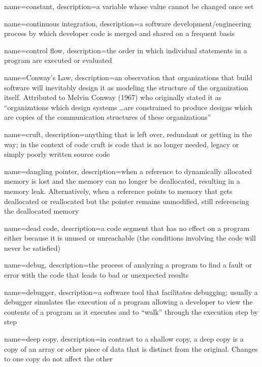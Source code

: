 {
  name=constant,
  description={a variable whose value cannot be changed once set}
}

{
  name=continuous integration,
  description={a software development/engineering process by which developer code is merged and shared on a frequent basis}
}

{
  name=control flow,
  description={the order in which individual statements in a program are executed or evaluated}
}

{
  name=Conway's Law,
  description={an observation that organizations that build software will inevitably design it as modeling the structure of the organization itself.  Attributed to Melvin Conway (1967) who originally stated it as ``organizations which design systems \ldots are constrained to produce designs which are copies of the communication structures of these organizations''}
}

{
  name=cruft,
  description={anything that is left over, redundant or getting in the way; in the context of code cruft is code that is no longer needed, legacy or simply poorly written source code}
}

{
  name=dangling pointer,
  description={when a reference to dynamically allocated memory is lost and the memory can no longer be deallocated, resulting in a memory leak.  Alternatively, when a reference points to memory that gets deallocated or reallocated but the pointer remains unmodified, still referencing the deallocated memory}
}

{
  name=dead code,
  description={a code segment that has no effect on a program either because it is unused or unreachable (the 
	conditions involving the code will never be satisfied)}
}

{
  name=debug,
  description={the process of analyzing a program to find a fault or error with the code that leads to bad or unexpected results}
}

{
  name=debugger,
  description={a software tool that facilitates debugging; usually a debugger simulates the execution of a program allowing a developer to view the contents of a program as it executes and to ``walk'' through the execution step by step}
}

{
  name=deep copy,
  description={in contrast to a shallow copy, a deep copy is a copy of an array or other piece of data that is distinct from the original.  Changes to one copy do not affect the other}
}

